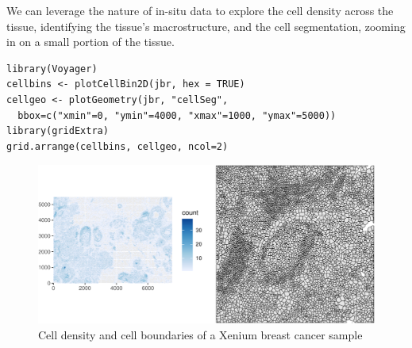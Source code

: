 \documentclass[graybox]{svmult}
\begin{document}

We can leverage the nature of in-situ data to explore the cell density across the
tissue, identifying the tissue's macrostructure, and the cell segmentation,
zooming in on a small portion of the tissue.

\begin{shaded}
\begin{verbatim}
library(Voyager)
cellbins <- plotCellBin2D(jbr, hex = TRUE)
cellgeo <- plotGeometry(jbr, "cellSeg", 
  bbox=c("xmin"=0, "ymin"=4000, "xmax"=1000, "ymax"=5000))
library(gridExtra)
grid.arrange(cellbins, cellgeo, ncol=2)
\end{verbatim}
\end{shaded}

\begin{figure}
\includegraphics[width=1\linewidth,]{spatpdfs/plotvoyager-1} \caption{Cell density and cell boundaries of a Xenium breast cancer sample}\label{fig:plotvoyager}
\end{figure}
\end{document}
